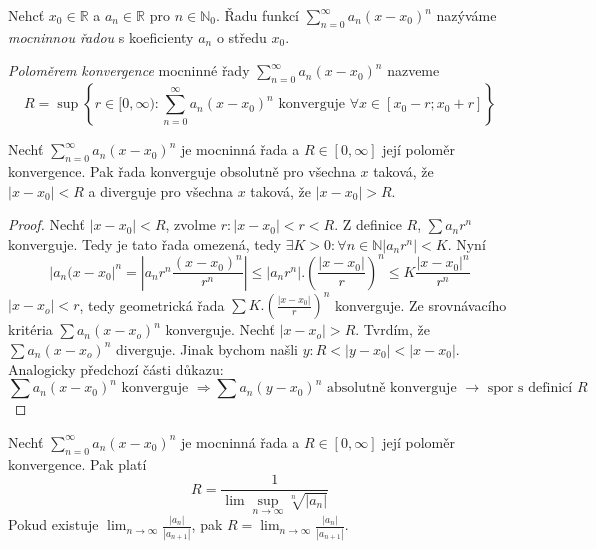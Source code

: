 \begin{definice}
Nehcť $x_0 \in \mathbb{R}$ a $a_n \in \mathbb{R}$ pro $n \in \mathbb{N}_0$. Řadu funkcí $\sum_{n=0}^{\infty} a_n (x-x_0)^n$ nazýváme \emph{mocninnou řadou} s koeficienty $a_n$ o středu $x_0$.
\end{definice}

\begin{definice}
\emph{Poloměrem konvergence} mocninné řady $\sum_{n=0}^{\infty} a_n (x-x_0)^n$ nazveme $$R = \sup \left\{ r \in [ 0,\infty ) : \sum_{n=0}^{\infty}  a_n ( x - x_0 )^n \textrm{ konverguje } \forall x \in [ x_0 - r; x_0 + r ] \right\}$$
\end{definice}

\begin{vetal}
Nechť $\sum_{n=0}^{\infty} a_n (x-x_0)^n$ je mocninná řada a $R \in [ 0, \infty ]$ její poloměr konvergence. Pak řada konverguje obsolutně pro všechna $x$ taková, že $| x - x_0| < R$ a diverguje pro všechna $x$ taková, že $| x - x_0 | > R$.
\end{vetal}

\begin{proof}
Nechť $|x-x_0|<R$, zvolme $r: |x-x_0|<r<R$. Z definice $R$, $\sum a_nr^n$ konverguje. Tedy je tato řada omezená, tedy $\exists K>0:\forall n \in \mathbb{N} |a_nr^n|<K$.
Nyní
$$|a_n(x-x_0|^n = |a_n r^n \frac{(x-x_0)^n}{r^n}| \leq |a_nr^n|. \left( \frac{|x-x_0|}{r} \right)^n \leq K \frac{|x-x_0|^n}{r^n} $$
$|x-x_o|<r$, tedy geometrická řada $\sum K. \left( \frac{|x-x_0|}{r} \right)^n$ konverguje. Ze srovnávacího kritéria $\sum a_n(x-x_o)^n$ konverguje.
Nechť $|x-x_o|>R$. Tvrdím, že $\sum a_n(x-x_o)^n$ diverguje. Jinak bychom našli $y: R< |y-x_0| < |x-x_0|$. Analogicky předchozí části důkazu:
$$\sum a_n(x-x_0)^n \textrm{ konverguje } \Rightarrow \sum a_n(y-x_0)^n \textrm{ absolutně konverguje } \rightarrow \textrm{ spor s definicí } R$$
\end{proof}

\begin{vetal}
Nechť $\sum_{n=0}^{\infty} a_n (x-x_0)^n$ je mocninná řada a $R \in [ 0, \infty ]$ její poloměr konvergence. Pak platí
$$R = \frac{1}{ \lim \sup_{n \rightarrow \infty} \sqrt[n]{| a_n |} }$$
Pokud existuje $\lim_{n \rightarrow \infty} \frac{|a_n|}{|a_{n+1}|}$, pak $R = \lim_{n \rightarrow \infty} \frac{|a_n|}{|a_{n+1}|}$.
\end{vetal}

